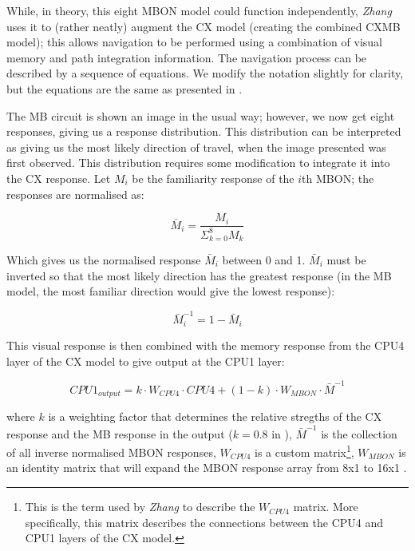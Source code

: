 \documentclass[a4paper,11pt,twoside,openright]{article}
\begin{document}
While, in theory, this eight MBON model could function independently,
\textit{Zhang} uses it to (rather neatly) augment the CX model
(creating the combined CXMB model); this allows navigation to be
performed using a combination of visual memory and path integration
information. The navigation process can be described by a sequence of
equations. We modify the notation slightly for clarity, but the
equations are the same as presented in \cite{Zhang2017}.
\newline
\par

The MB circuit is shown an image in the usual way; however, we now
get eight responses, giving us a response distribution. This distribution can
be interpreted as giving us the most likely direction of travel, when the image
presented was first observed. This distribution requires some modification to
integrate it into the CX response. Let $M_i$ be the familiarity response of the
$i$th MBON; the responses are normalised as:

\begin{equation}
  \bar{M}_i = \frac{M_i}{\Sigma^{8}_{k = 0} M_k}
\end{equation}

Which gives us the normalised response $\bar{M}_i$ between 0 and 1. $\bar{M}_i$
must be inverted so that the most likely direction has the greatest response
(in the MB model, the most familiar direction would give the lowest response):

\begin{equation}
  \bar{M}^{-1}_i = 1 - \bar{M}_i
\end{equation}

This visual response is then combined with the memory response from the CPU4
layer of the CX model to give output at the CPU1 layer:

\begin{equation}
  CPU1_{output} = k \cdot W_{CPU4} \cdot CPU4 + (1 - k) \cdot W_{MBON} \cdot
  \bar{M}^{-1}
\end{equation}

where $k$ is a weighting factor that determines the relative stregths of the CX
response and the MB response in the output ($k = 0.8$ in \cite{Zhang2017}),
$\bar{M}^{-1}$ is the collection of all inverse normalised MBON responses,
$W_{CPU4}$ is a custom matrix\footnote{This is the term used by \textit{Zhang} to
  describe   the $W_{CPU4}$ matrix. More specifically, this matrix describes the
  connections between the CPU4 and CPU1 layers of the CX model.}, $W_{MBON}$ is
an identity matrix that will expand the MBON response array from 8x1 to 16x1
\cite{Zhang2017}.
\newline
\par
\end{document}
